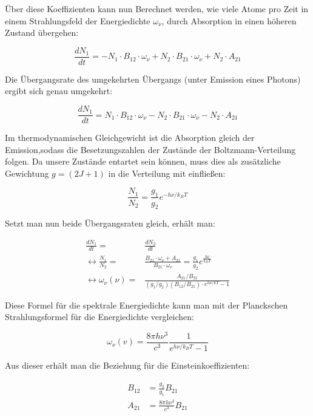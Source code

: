 Über diese Koeffizienten kann nun Berechnet werden, wie viele Atome pro Zeit in einem Strahlungsfeld der Energiedichte $\omega_{\nu}$,  durch Absorption in einen höheren Zustand übergehen:

\begin{equation}
\frac{dN_1}{dt}=-N_1 \cdot B_{12} \cdot \omega_{\nu} + N_2 \cdot B_{21} \cdot \omega_{\nu} + N_2 \cdot A_{21}
\end{equation}

Die Übergangsrate des umgekehrten Übergangs (unter Emission eines Photons) ergibt sich genau umgekehrt:

\begin{equation}
\frac{dN_1}{dt}= N_1 \cdot B_{12} \cdot \omega_{\nu} - N_2 \cdot B_{21} \cdot \omega_{\nu} - N_2 \cdot A_{21}
\end{equation}

Im thermodynamischen Gleichgewicht ist  die Absorption gleich der Emission,sodass die Besetzungszahlen der Zustände der Boltzmann-Verteilung folgen. Da unsere Zustände entartet sein können, muss dies als zusätzliche Gewichtung $g=(2J+1)$ in die Verteilung mit einfließen:

\begin{equation}
\frac{N_1}{N_2} = \frac{g_1}{g_2} e^{-h\nu/k_BT}
\end{equation}

Setzt man nun beide Übergangsraten gleich, erhält man:

\begin{align}
\frac{dN_1}{dt} =& \frac{dN_2}{dt}\\
\leftrightarrow \frac{N_1}{N_2} =& \frac{B_{21}\cdot \omega_{\nu} +A_{21}}{B_{21}\cdot \omega_{\nu}} = \frac{g_1}{g_2}e^{\frac{h\nu}{k_BT}} \\
\leftrightarrow \omega_{\nu}(\nu) =& \frac{A_{21}/B_{21}}{(g_1/g_2)(B_{12}/B_{21})\cdot e^{h\nu/kT}-1}
\end{align}

Diese Formel für die spektrale Energiedichte kann man mit der Planckschen Strahlungsformel für die Energiedichte vergleichen:

\begin{equation}
\omega_{\nu}(v) = \frac{8\pi h\nu^3}{c^3}\frac{1}{e^{h\nu/k_B T}-1}
\end{equation}

Aus dieser erhält man die Beziehung für die Einsteinkoeffizienten:

\begin{align}
B_{12} &= \frac{g_2}{g_1}B_{21}\\
A_{21} &= \frac{8\pi h\nu^3}{c^3}B_{21}
\end{align}

